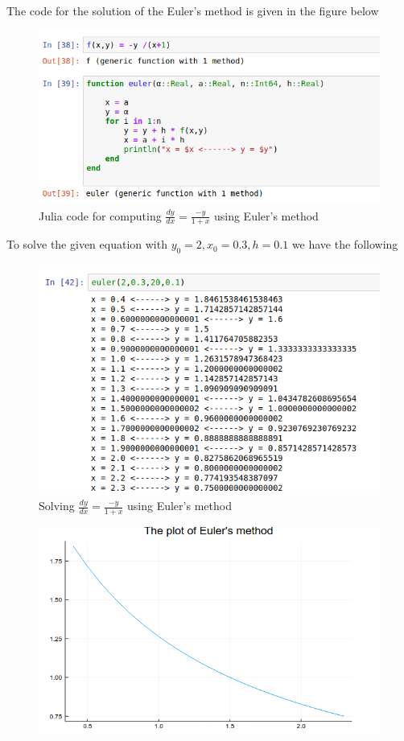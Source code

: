 \documentclass[a4paper,12pt,openany]{book}
\begin{document}
\begin{problem}
	
\end{problem}
\begin{soln}
	The code for the solution of the Euler's method is given in the figure below
	\begin{figure}[H]
		\centering
		\includegraphics[width= .7\linewidth]{pic14}
		\caption{Julia code for computing $ \frac{dy}{dx} = \frac{-y}{1+x}$ using Euler's method}
	\end{figure}
To solve the given equation with $y_0 = 2, x_0 = 0.3, h= 0.1$ we have the following
\begin{figure}[H]
	\centering
	\includegraphics[width= .7\linewidth]{pic15}
	\caption{Solving $ \frac{dy}{dx} = \frac{-y}{1+x}$ using Euler's method}
\end{figure}
\begin{figure}[H]
	\centering
	\includegraphics[width=.7\linewidth]{pic26}

\end{figure}
\end{soln}
\end{document}
